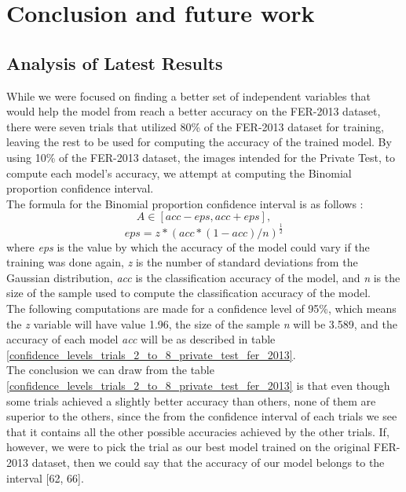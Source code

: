 \documentclass[runningheads,a4paper,11pt]{report}
\begin{document}
\chapter{Conclusion and future work}
\label{chapter:conclusions}

\section{Analysis of Latest Results}
\label{section:lates_analysis}

While we were focused on finding a better set of independent variables that would help the model from \cite{Arriaga17} reach a better accuracy on the FER-2013 dataset, there were seven trials that utilized 80\% of the FER-2013 dataset for training, leaving the rest to be used for computing the accuracy of the trained model. By using 10\% of the FER-2013 dataset, the images intended for the Private Test, to compute each model's accuracy, we attempt at computing the Binomial proportion confidence interval.\\
The formula for the Binomial proportion confidence interval is as follows \cite{WikipediaConfidenceInterval}: \[ A \in [acc - eps, acc + eps], \] \[ eps = z*(acc*(1-acc)/n)^\frac{1}{2} \] where \textit{eps} is the value by which the accuracy of the model could vary if the training was done again, \textit{z} is the number of standard deviations from the Gaussian distribution, \textit{acc} is the classification accuracy of the model, and \textit{n} is the size of the sample used to compute the classification accuracy of the model. \\
The following computations are made for a confidence level of 95\%, which means the \textit{z} variable will have value 1.96, the size of the sample \textit{n} will be 3.589, and the accuracy of each model \textit{acc} will be as described in table \ref{confidence_levels_trials_2_to_8_private_test_fer_2013}. \\
The conclusion we can draw from the table \ref{confidence_levels_trials_2_to_8_private_test_fer_2013} is that even though some trials achieved a slightly better accuracy than others, none of them are superior to the others, since the from the confidence interval of each trials we see that it contains all the other possible accuracies achieved by the other trials. If, however, we were to pick the  trial as our best model trained on the original FER-2013 dataset, then we could say that the accuracy of our model belongs to the interval [62, 66]. \\
\end{document}
